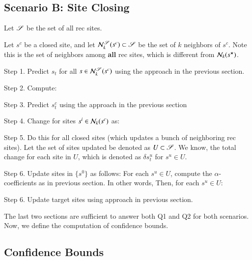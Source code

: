 \documentclass[onecolumn, compsoc,10pt]{IEEEtran}
\begin{document}
\subsection{Scenario B: Site Closing}

Let $\S$ be the set of all rec sites.

Let $s^c$ be a closed site, and let $\N_k^\S(s^c) \subset \S$ be the set of $k$ neighbors of $s^c$. Note this is the set of neighbors among \textbf{all} rec sites, which is different from $\N_k(\ss)$.


Step 1. Predict $s_t$ for all $s \in \N_k^\S(s^c)$ using the approach in the previous section.

Step 2. Compute:

Step 3. Predict $s^c_t$ using the approach in the previous section

Step 4. Change for  sites  $s^i \in \N_k(s^c)$ as:

Step 5. Do this for all closed sites (which updates a bunch of neighboring rec sites). Let the set of sites updated be denoted as $U \subset \S$. We know, the total change for each site in $U$, which is denoted as $\delta s^u_t$ for $s^u \in U$.

Step 6. Update sites in $\{s^0\}$ as follows:
For each $s^u \in U$, compute the $\alpha$-coefficients as in previous section. In other words, 
Then, for each $s^u \in U$:

Step 6.  Update target sites using approach in previous section.


The last two sections are sufficient to answer both Q1 and Q2 for both scenarios. Now, we define the computation of confidence bounds.

\subsection*{Confidence Bounds}


\clearpage
\end{document}
